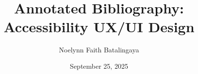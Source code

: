 \documentclass[12pt]{article}
\title{\textbf{Annotated Bibliography: Accessibility UX/UI Design}}
\author{Noelynn Faith Batalingaya}
\date{September 25, 2025}
\begin{document}
\maketitle

\nocite{alshayban2020androidaccess,duan2024mockupfeedback,duan2024uicrit,muniz2024figmatemplates,zhang2021screenrecognition}



\end{document}
